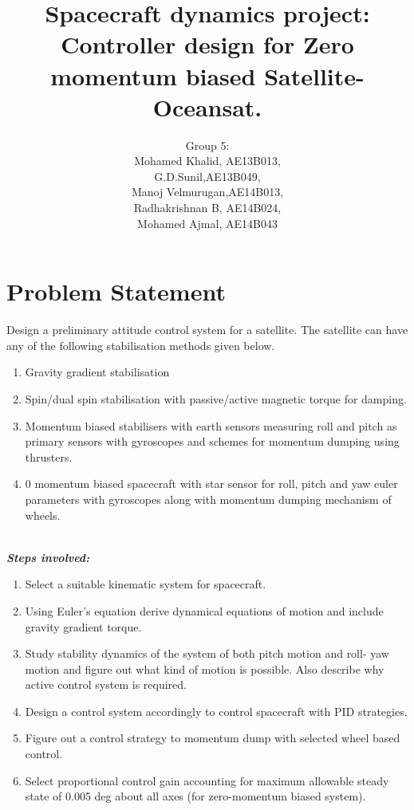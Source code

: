 \documentclass[10pt,a4paper]{report}
\author{Group 5:\\Mohamed Khalid, AE13B013,\\G.D.Sunil,AE13B049,\\Manoj Velmurugan,AE14B013,\\Radhakrishnan B, AE14B024,\\Mohamed Ajmal, AE14B043 }
\title{Spacecraft dynamics project: Controller design for Zero momentum biased Satellite-Oceansat.}
\begin{document}
\maketitle
\tableofcontents
\chapter{Problem Statement}
Design a preliminary attitude control system for a satellite. The satellite can have any of the following stabilisation methods given below.
\begin{enumerate}
\item Gravity gradient stabilisation
\item Spin/dual spin stabilisation with passive/active magnetic torque for damping. 
\item Momentum biased stabilisers with earth sensors measuring roll and pitch as primary sensors with gyroscopes and schemes for momentum dumping using thrusters.
\item 0 momentum biased spacecraft with star sensor for roll, pitch and yaw euler parameters with gyroscopes along with momentum dumping mechanism of wheels.\\
\\
\end{enumerate}

\emph{\textbf{Steps involved:}}
\begin{enumerate}
\item Select a suitable kinematic system for spacecraft.
\item Using Euler's equation derive dynamical equations of motion and include gravity gradient torque.
\item Study stability dynamics of the system of both pitch motion and roll-
yaw motion and figure out what kind of motion is possible. Also describe why active control system is required.
\item Design a control system accordingly to control spacecraft with PID strategies.
\item Figure out a control strategy to momentum dump with selected wheel based control.
\item Select proportional control gain accounting for maximum allowable steady state 
of 0.005 deg about all axes (for zero-momentum biased system).

\end{enumerate}
\end{document}
